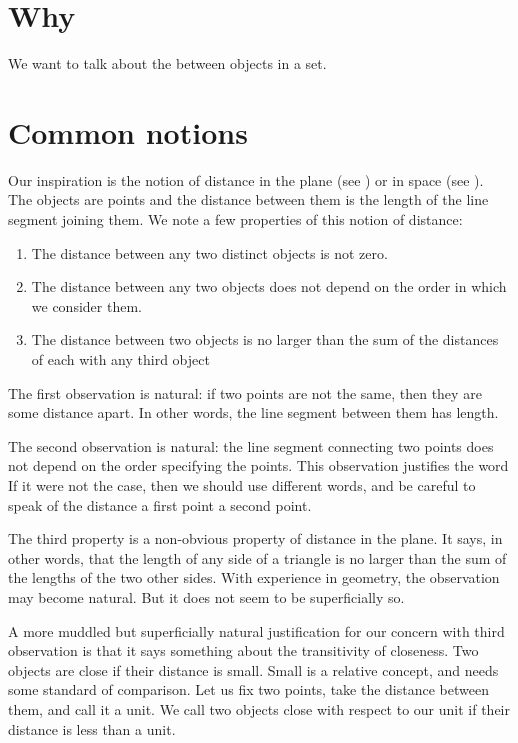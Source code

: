 

\section*{Why}

We want to talk about the  between objects in a set.

\section*{Common notions}

Our inspiration is the notion of distance in the plane (see ) or in space (see ).
The objects are points and the distance between them is the length of the line segment joining them.
We note a few properties of this notion of distance:
    \begin{enumerate}
      \item The distance between any two distinct objects is not zero.
      \item The distance between any two objects does not depend on the order in which we consider them.
      \item The distance between two objects is no larger than the sum of the distances of each with any third object
    \end{enumerate}

The first observation is natural: if two points are not the same, then they are some distance apart.
In other words, the line segment between them has length.

The second observation is natural: the line segment connecting two points does not depend on the order specifying the points.
This observation justifies the word 
If it were not the case, then we should use different words, and be careful to speak of the distance  a first point  a second point.

The third property is a non-obvious property of distance in the plane.
It says, in other words, that the length of any side of a triangle is no larger than the sum of the lengths of the two other sides.
With experience in geometry, the observation may become natural.
But it does not seem to be superficially so.

A more muddled but superficially natural justification for our concern with third observation is that it says something about the transitivity of closeness.
Two objects are close if their distance is small.
Small is a relative concept, and needs some standard of comparison.
Let us fix two points, take the distance between them, and call it a unit.
We call two objects close with respect to our unit if their distance is less than a unit.

